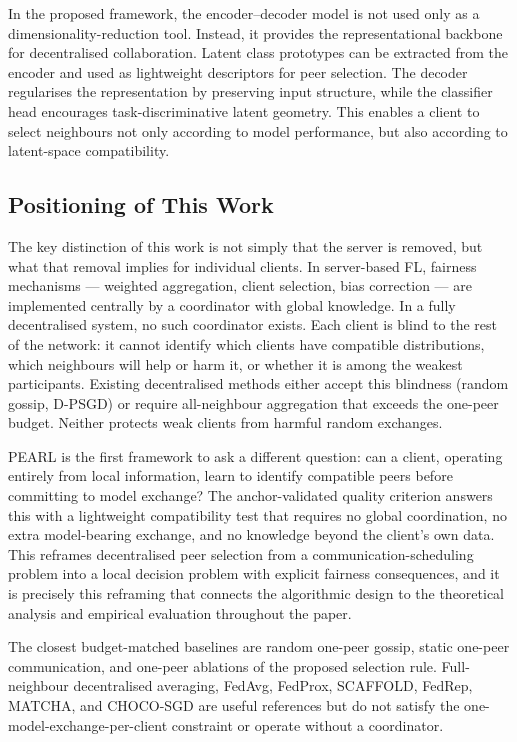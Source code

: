 \documentclass[conference]{IEEEtran}
\begin{document}
In the proposed framework, the encoder--decoder model is not used only as a dimensionality-reduction tool. Instead, it provides the representational backbone for decentralised collaboration. Latent class prototypes can be extracted from the encoder and used as lightweight descriptors for peer selection. The decoder regularises the representation by preserving input structure, while the classifier head encourages task-discriminative latent geometry. This enables a client to select neighbours not only according to model performance, but also according to latent-space compatibility.

\subsection{Positioning of This Work}
\label{subsec:positioning-of-this-work}

The key distinction of this work is not simply that the server is removed, but what that removal implies for individual clients. In server-based FL, fairness mechanisms --- weighted aggregation, client selection, bias correction --- are implemented centrally by a coordinator with global knowledge. In a fully decentralised system, no such coordinator exists. Each client is blind to the rest of the network: it cannot identify which clients have compatible distributions, which neighbours will help or harm it, or whether it is among the weakest participants. Existing decentralised methods either accept this blindness (random gossip, D-PSGD) or require all-neighbour aggregation that exceeds the one-peer budget. Neither protects weak clients from harmful random exchanges.

PEARL is the first framework to ask a different question: can a client, operating entirely from local information, learn to identify compatible peers before committing to model exchange? The anchor-validated quality criterion answers this with a lightweight compatibility test that requires no global coordination, no extra model-bearing exchange, and no knowledge beyond the client's own data. This reframes decentralised peer selection from a communication-scheduling problem into a local decision problem with explicit fairness consequences, and it is precisely this reframing that connects the algorithmic design to the theoretical analysis and empirical evaluation throughout the paper.

The closest budget-matched baselines are random one-peer gossip, static one-peer communication, and one-peer ablations of the proposed selection rule. Full-neighbour decentralised averaging, FedAvg, FedProx, SCAFFOLD, FedRep, MATCHA, and CHOCO-SGD are useful references but do not satisfy the one-model-exchange-per-client constraint or operate without a coordinator.
\end{document}
